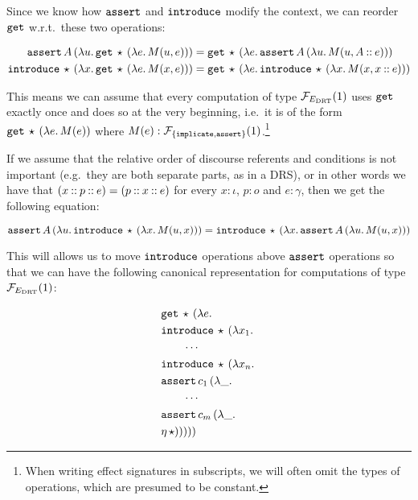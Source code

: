 Since we know how $\mathtt{assert}$ and $\mathtt{introduce}$ modify the context, we
can reorder $\mathtt{get}$ w.r.t.\ these two operations:

\begin{align*}
   \mathtt{assert}\,A\,(\lambda u.\, \mathtt{get}\,\star\,(\lambda e.\, M(u, e)))
&= \mathtt{get}\,\star\,(\lambda e.\, \mathtt{assert}\,A\,(\lambda u.\, M(u, A \mathbin{::} e))) \\
   \mathtt{introduce}\,\star\,(\lambda x.\, \mathtt{get}\,\star\,(\lambda e.\, M(x, e)))
&= \mathtt{get}\,\star\,(\lambda e.\, \mathtt{introduce}\,\star\,(\lambda x.\, M(x, x \mathbin{::} e))) \\
\end{align*}

This means we can assume that every computation of type $\mathcal{F}_{E_{\mathrm{DRT}}}(1)$
uses $\mathtt{get}$ exactly once and does so at the very beginning, i.e.\ it is
of the form $\mathtt{get}\,\star\,(\lambda e.\, M(e))$ where
$M(e) : \mathcal{F}_{\{\mathtt{implicate}, \mathtt{assert}\}}(1)$.\footnote{When writing
  effect signatures in subscripts, we will often omit the types of
  operations, which are presumed to be constant.}

If we assume that the relative order of discourse referents and conditions
is not important (e.g.\ they are both separate parts, as in a DRS), or in
other words we have that $(x \mathbin{::} p \mathbin{::} e) = (p \mathbin{::} x \mathbin{::} e)$ for
every $x : \iota$, $p : o$ and $e : \gamma$, then we get the following
equation:

$$
  \mathtt{assert}\,A\,(\lambda u.\, \mathtt{introduce}\,\star\,(\lambda x.\, M(u, x))) 
= \mathtt{introduce}\,\star\,(\lambda x.\, \mathtt{assert}\,A\,(\lambda u.\, M(u, x)))
$$

This will allows us to move $\mathtt{introduce}$ operations above $\mathtt{assert}$
operations so that we can have the following canonical representation for
computations of type $\mathcal{F}_{E_{\mathrm{DRT}}}(1)$:

\begin{align*}
  &\mathtt{get}\,\star\,(\lambda e.\,  \\
  &\mathtt{introduce}\,\star\,(\lambda x_1.\,  \\
  &\qquad \cdots \\
  &\mathtt{introduce}\,\star\,(\lambda x_n.\,  \\
  &\mathtt{assert}\,c_1\,(\lambda \_.\,  \\
  &\qquad \cdots \\
  &\mathtt{assert}\,c_m\,(\lambda \_.\,  \\
  &\eta\,\star)))))
\end{align*}

